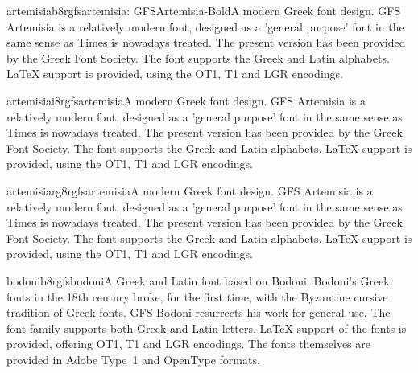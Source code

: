 \documentclass{ddltxtyp}
\begin{document}
\begin{package}{artemisiab8r}{gfsartemisia: GFSArtemisia-Bold}{A modern Greek font design.}
GFS Artemisia is a relatively modern font, designed as a
'general purpose' font in the same sense as Times is nowadays
treated. The present version has been provided by the Greek
Font Society. The font supports the Greek and Latin alphabets.
{\LaTeX} support is provided, using the OT1, T1 and LGR encodings.
\end{package}
\begin{package}{artemisiai8r}{gfsartemisia}{A modern Greek font design.}
GFS Artemisia is a relatively modern font, designed as a
'general purpose' font in the same sense as Times is nowadays
treated. The present version has been provided by the Greek
Font Society. The font supports the Greek and Latin alphabets.
{\LaTeX} support is provided, using the OT1, T1 and LGR encodings.
\end{package}
\begin{package}{artemisiarg8r}{gfsartemisia}{A modern Greek font design.}
GFS Artemisia is a relatively modern font, designed as a
'general purpose' font in the same sense as Times is nowadays
treated. The present version has been provided by the Greek
Font Society. The font supports the Greek and Latin alphabets.
{\LaTeX} support is provided, using the OT1, T1 and LGR encodings.
\end{package}

\begin{package}{bodonib8r}{gfsbodoni}{A Greek and Latin font based on Bodoni.}
Bodoni's Greek fonts in the 18th century broke, for the first
time, with the Byzantine cursive tradition of Greek fonts. GFS
Bodoni resurrects his work for general use. The font family
supports both Greek and Latin letters. {\LaTeX} support of the
fonts is provided, offering OT1, T1 and LGR encodings. The
fonts themselves are provided in Adobe Type~1 and OpenType
formats.
\end{package}

\end{document}
